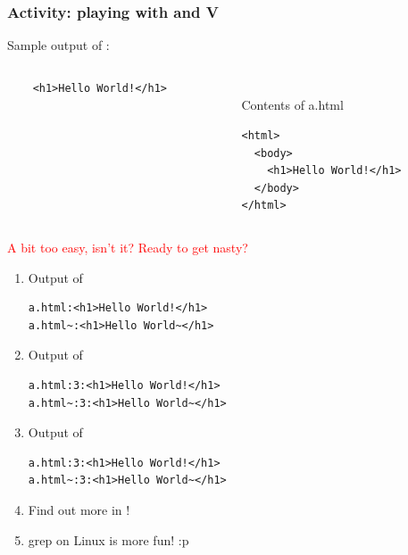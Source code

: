 \begin{frame}[fragile]
\frametitle{Activity: playing with  and  V}
Sample output of :

\begin{columns}
\begin{column}{0.5\textwidth}

\begin{verbatim}
    <h1>Hello World!</h1>
\end{verbatim}
\end{column}

\begin{column}{0.5\textwidth}
\\Contents of a.html
\begin{verbatim}
<html>
  <body>
    <h1>Hello World!</h1>
  </body>
</html>
\end{verbatim}
\end{column}
\end{columns}

\pause
\textcolor{red}{A bit too easy, isn't it? Ready to get nasty?}
\end{frame}

\begin{frame}[fragile]
\begin{enumerate}

\item Output of 

\begin{verbatim}
a.html:<h1>Hello World!</h1>
a.html~:<h1>Hello World~</h1>
\end{verbatim}

\pause
\item Output of 
\begin{verbatim}
a.html:3:<h1>Hello World!</h1>
a.html~:3:<h1>Hello World~</h1>
\end{verbatim}

\pause
\item Output of 
\begin{verbatim}
a.html:3:<h1>Hello World!</h1>
a.html~:3:<h1>Hello World~</h1>
\end{verbatim}

\pause
\item Find out more in  !
\pause
\item grep on Linux is more fun! :p
\end{enumerate}
\end{frame}
